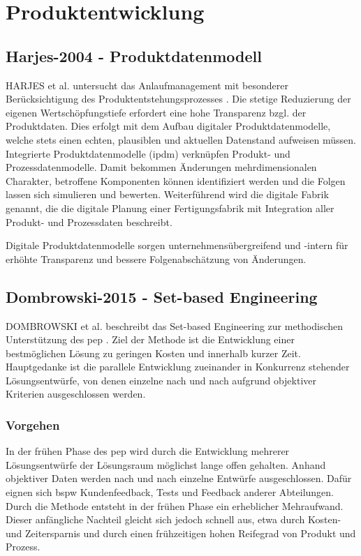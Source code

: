 \section{Produktentwicklung}
\subsection*{Harjes-2004 - Produktdatenmodell}
HARJES et al. untersucht das Anlaufmanagement mit besonderer Berücksichtigung des Produktentstehungsprozesses \cite{Harjes2004}. 
Die stetige Reduzierung der eigenen Wertschöpfungstiefe erfordert eine hohe Transparenz bzgl. der Produktdaten. Dies erfolgt mit dem Aufbau digitaler Produktdatenmodelle, welche stets einen echten, plausiblen und aktuellen Datenstand aufweisen müssen. 
Integrierte Produktdatenmodelle (\gls{ipdm})
verknüpfen Produkt- und Prozessdatenmodelle. Damit bekommen Änderungen mehrdimensionalen Charakter, betroffene Komponenten können identifiziert werden und die Folgen lassen sich simulieren und bewerten. 
Weiterführend wird die digitale Fabrik genannt, die die digitale Planung einer Fertigungsfabrik mit Integration aller Produkt- und Prozessdaten beschreibt. 

Digitale Produktdatenmodelle sorgen unternehmensübergreifend und -intern für erhöhte Transparenz und bessere Folgenabschätzung von Änderungen. 


\subsection*{Dombrowski-2015 - Set-based Engineering}

DOMBROWSKI et al. beschreibt das Set-based Engineering zur methodischen Unterstützung des \gls{pep} \cite{Dombrowski2015}. %
Ziel der Methode ist die Entwicklung einer bestmöglichen Lösung zu geringen Kosten und innerhalb kurzer Zeit. 
Hauptgedanke ist die parallele Entwicklung zueinander in Konkurrenz stehender Lösungsentwürfe, von denen einzelne nach und nach aufgrund objektiver Kriterien ausgeschlossen werden. %
\subsubsection*{Vorgehen}
In der frühen Phase des \gls{pep} wird durch die Entwicklung mehrerer Lösungsentwürfe der Lösungsraum möglichst lange offen gehalten. Anhand objektiver Daten werden nach und nach einzelne Entwürfe ausgeschlossen. Dafür eignen sich \gls{bspw} Kundenfeedback, Tests und Feedback anderer Abteilungen. 
Durch die Methode entsteht in der frühen Phase ein erheblicher Mehraufwand. Dieser anfängliche Nachteil gleicht sich jedoch schnell aus, etwa durch Kosten- und Zeitersparnis und durch einen frühzeitigen hohen Reifegrad von Produkt und Prozess. 

